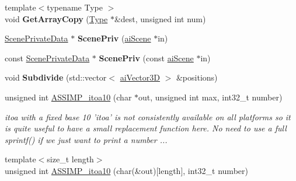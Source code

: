 \begin{DoxyCompactItemize}
\item 
\hypertarget{namespace_assimp_ac59eadf404c7070e3fdf3cf42ab7ce8c}{{\footnotesize template$<$typename Type $>$ }\\void {\bfseries Get\+Array\+Copy} (\hyperlink{struct_type}{Type} $\ast$\&dest, unsigned int num)}\label{namespace_assimp_ac59eadf404c7070e3fdf3cf42ab7ce8c}

\item 
\hypertarget{namespace_assimp_a2b232d996d6904712ea1fe230214bc66}{\hyperlink{struct_assimp_1_1_scene_private_data}{Scene\+Private\+Data} $\ast$ {\bfseries Scene\+Priv} (\hyperlink{structai_scene}{ai\+Scene} $\ast$in)}\label{namespace_assimp_a2b232d996d6904712ea1fe230214bc66}

\item 
\hypertarget{namespace_assimp_a125129784406364f0a08260fa93f870b}{const \hyperlink{struct_assimp_1_1_scene_private_data}{Scene\+Private\+Data} $\ast$ {\bfseries Scene\+Priv} (const \hyperlink{structai_scene}{ai\+Scene} $\ast$in)}\label{namespace_assimp_a125129784406364f0a08260fa93f870b}

\item 
\hypertarget{namespace_assimp_ae03f4b36efe4a3c71af475d2079f611a}{void {\bfseries Subdivide} (std\+::vector$<$ \hyperlink{structai_vector3_d}{ai\+Vector3\+D} $>$ \&positions)}\label{namespace_assimp_ae03f4b36efe4a3c71af475d2079f611a}

\item 
unsigned int \hyperlink{namespace_assimp_a95de3dd4de6a42bfed3eb0a9fcea48be}{A\+S\+S\+I\+M\+P\+\_\+itoa10} (char $\ast$out, unsigned int max, int32\+\_\+t number)
\begin{DoxyCompactList}\small\item\em itoa with a fixed base 10 'itoa' is not consistently available on all platforms so it is quite useful to have a small replacement function here. No need to use a full sprintf() if we just want to print a number ... \end{DoxyCompactList}\item 
\hypertarget{namespace_assimp_a780ce39f05ccc110f67a59dd76709112}{{\footnotesize template$<$size\+\_\+t length$>$ }\\unsigned int \hyperlink{namespace_assimp_a780ce39f05ccc110f67a59dd76709112}{A\+S\+S\+I\+M\+P\+\_\+itoa10} (char(\&out)\mbox{[}length\mbox{]}, int32\+\_\+t number)}\label{namespace_assimp_a780ce39f05ccc110f67a59dd76709112}


\end{DoxyCompactItemize}

